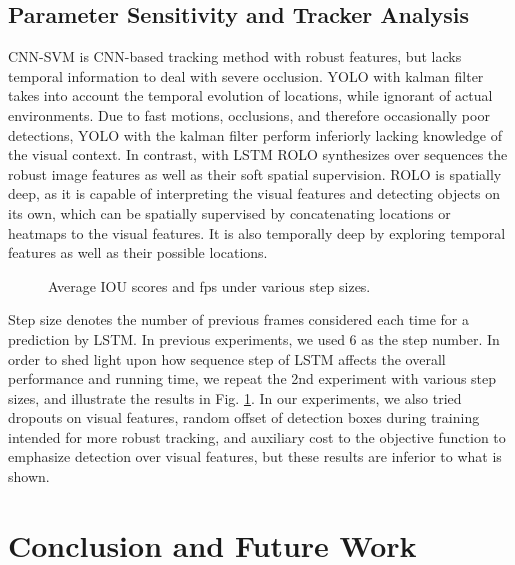 \documentclass{article}
\begin{document}
\subsection{Parameter Sensitivity and Tracker Analysis}
CNN-SVM is CNN-based tracking method with robust features, but lacks temporal information to deal with severe occlusion.
YOLO with kalman filter takes into account the temporal evolution of locations, while ignorant of actual environments. Due to fast motions, occlusions, and therefore occasionally poor detections, YOLO with the kalman filter perform inferiorly lacking knowledge of the visual context.
In contrast, with LSTM ROLO synthesizes over sequences the robust image features as well as their soft spatial supervision.
ROLO is spatially deep, as it is capable of interpreting the visual features and detecting objects on its own, which can be spatially supervised by concatenating locations or heatmaps to the visual features. It is also temporally deep by exploring temporal features as well as their possible locations.
\begin{figure}[!ht]
	\centering
	\caption{Average IOU scores and fps under various step sizes.}
	\label{fig-steps}
\end{figure}
Step size
denotes the number of previous frames considered each time for a prediction by LSTM. In previous experiments, we used 6 as the step number.
In order to shed light upon how sequence step of LSTM affects the overall performance and running time, we repeat the 2nd experiment with various step sizes, and illustrate the results in Fig. \ref{fig-steps}.
In our experiments, we also tried dropouts on visual features, random offset of detection boxes during training intended for more robust tracking, and auxiliary cost to the objective function to emphasize detection over visual features, but these results are inferior to what is shown.

\section{Conclusion and Future Work}
\end{document}
